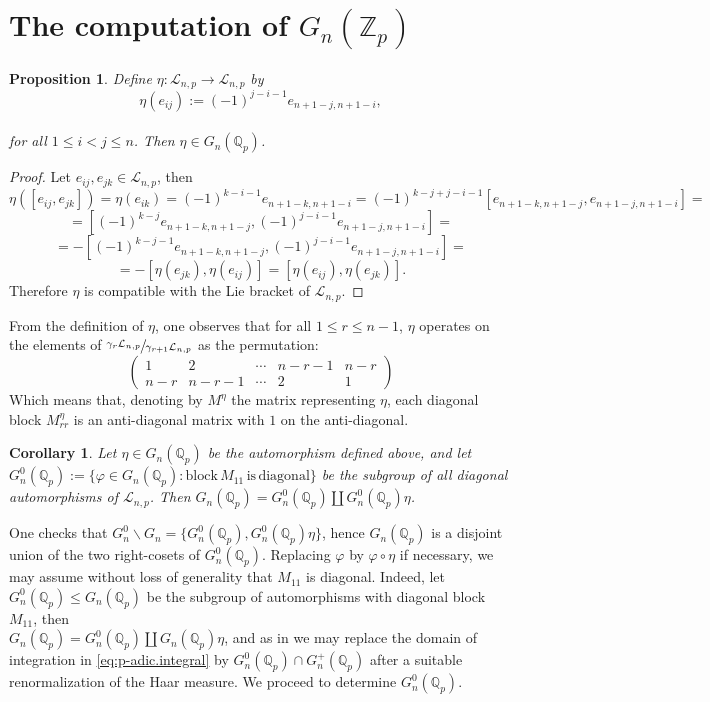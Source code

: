 \documentclass{article}
\newtheorem{proposition2}[theorem2]{Proposition}
\newtheorem{corollary2}[theorem2]{Corollary}
\begin{document}
\section{The computation of $G_{n}(\mathbb{Z}_{p})$}
\begin{proposition2}
Define $\eta:\mathcal{L}_{n,p}\rightarrow\mathcal{L}_{n,p}$ by \[\eta(e_{ij}):=(-1)^{j-i-1}e_{n+1-j,n+1-i},\]\\ for all $1\leq{i}<{j}\leq{n}$. Then
$\eta\in{G_{n}(\mathbb{Q}_{p})}$.
\end{proposition2}
\begin{proof}
Let $e_{ij},e_{jk}\in\mathcal{L}_{n,p}$, then $\eta([e_{ij},e_{jk}])=\eta(e_{ik})=(-1)^{k-i-1}e_{n+1-k,n+1-i}=(-1)^{k-j+j-i-1}[e_{n+1-k,n+1-j},e_{n+1-j,n+1-i}]=$\[=[(-1)^{k-j}e_{n+1-k,n+1-j},(-1)^{j-i-1}e_{n+1-j,n+1-i}]=\]\[=-[(-1)^{k-j-1}e_{n+1-k,n+1-j},(-1)^{j-i-1}e_{n+1-j,n+1-i}]=\]\[=-[\eta(e_{jk}),\eta(e_{ij})]=[\eta(e_{ij}),\eta(e_{jk})].\]
Therefore $\eta$ is compatible with the Lie bracket of $\mathcal{L}_{n,p}$.
\end{proof}
From the definition of $\eta$, one observes that for all $1\leq{r}\leq{n-1}$, $\eta$ operates on the elements of $\sfrac{\gamma_{r}\mathcal{L}_{n,p}}{\gamma_{r+1}\mathcal{L}_{n,p}}$ as the permutation: \[  \begin{pmatrix}
    1 & 2 & \cdots & n-r-1 & n-r \\
    n-r & n-r-1 & \cdots & 2 & 1
  \end{pmatrix}\]
Which means that, denoting by $M^{\eta}$ the matrix representing $\eta$, each diagonal block $M^{\eta}_{rr}$ is an anti-diagonal matrix with $1$ on the anti-diagonal.
\begin{corollary2}
Let $\eta\in{G_{n}(\mathbb{Q}_{p})}$ be the automorphism defined above, and let $G_{n}^{0}(\mathbb{Q}_{p}):=\{\varphi\in{G_{n}(\mathbb{Q}_{p})} : \mathrm{block}\,M_{11}\,\mathrm{is}\,\mathrm{diagonal}\}$ be the subgroup of all diagonal automorphisms of $\mathcal{L}_{n,p}$. Then $G_{n}(\mathbb{Q}_{p})=G_{n}^{0}(\mathbb{Q}_{p})\coprod{G_{n}^{0}(\mathbb{Q}_{p})\eta}$.
\end{corollary2}
One checks that ${G_{n}^{0}}\backslash{G_{n}}=\{G_{n}^{0}(\mathbb{Q}_{p}),G_{n}^{0}(\mathbb{Q}_{p})\eta\}$, hence $G_{n}(\mathbb{Q}_{p})$ is a disjoint union of the two right-cosets of $G_{n}^{0}(\mathbb{Q}_{p})$.
Replacing $\varphi$ by $\varphi\circ\eta$ if necessary, we may assume without loss of generality that $M_{11}$ is diagonal. Indeed, let $G_{n}^{0}(\mathbb{Q}_{p})\leq{G_{n}(\mathbb{Q}_{p})}$ be the subgroup of automorphisms with diagonal block $M_{11}$, then\\ $G_{n}(\mathbb{Q}_{p})=G_{n}^{0}(\mathbb{Q}_{p})\coprod{G_{n}(\mathbb{Q}_{p})}\eta$, and as in \cite[Proposition 2.1]{DuSautoyLubotzky} we may replace the domain of integration in \eqref{eq:p-adic.integral} by $G_{n}^{0}(\mathbb{Q}_{p})\cap{G_{n}^{+}(\mathbb{Q}_{p})}$ after a suitable renormalization of the Haar measure. We proceed to determine $G_{n}^{0}(\mathbb{Q}_{p})$.
\end{document}
